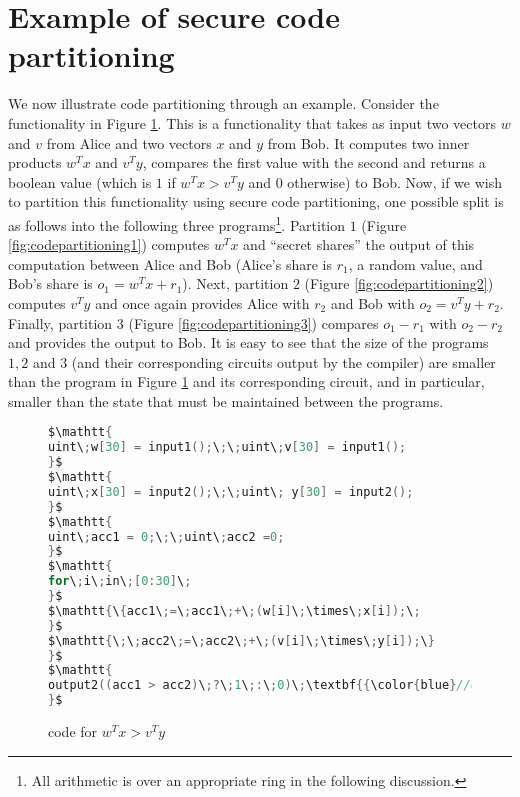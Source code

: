 
\setlength\intextsep{5pt}
\setlength{\textfloatsep}{5pt}
\setlength{\abovecaptionskip}{5pt}
\setlength{\belowcaptionskip}{5pt}

\section{Example of secure code partitioning}\label{app:codepartitioning}
We now illustrate code partitioning through an example. Consider the functionality in Figure \ref{fig:largecode}. This is a functionality that takes as input two vectors $w$ and $v$ from Alice and two vectors $x$ and $y$ from Bob. It computes two inner products $w^Tx$ and $v^Ty$, compares the first value with the second and returns a boolean value (which is $1$ if $w^Tx>v^Ty$ and $0$ otherwise) to Bob. Now, if we wish to partition this functionality using secure code partitioning, one possible split is as follows into the following three programs\footnote{All arithmetic is over an appropriate ring in the following discussion.}. Partition $1$ (Figure \ref{fig:codepartitioning1}) computes $w^Tx$ and ``secret shares'' the output of this computation between Alice and Bob (Alice's share is $r_1$, a random value, and Bob's share is $o_1 = w^Tx+r_1$). Next, partition $2$ (Figure \ref{fig:codepartitioning2}) computes $v^Ty$ and once again provides Alice with $r_2$ and Bob with $o_2 = v^Ty+r_2$. Finally, partition $3$ (Figure \ref{fig:codepartitioning3}) compares $o_1-r_1$ with $o_2-r_2$ and provides the output to Bob. It is easy to see that the size of the programs $1, 2$ and $3$ (and their corresponding circuits output by the \tool compiler) are smaller than the program in Figure \ref{fig:largecode} and its corresponding circuit, and in particular, smaller than the state that must be maintained between the programs.

\begin{figure}
\begin{lstlisting}[language=C,mathescape=true]
$\mathtt{
uint\;w[30] = input1();\;\;uint\;v[30] = input1();
}$
$\mathtt{
uint\;x[30] = input2();\;\;uint\; y[30] = input2();
}$
$\mathtt{
uint\;acc1 = 0;\;\;uint\;acc2 =0;
}$
$\mathtt{
for\;i\;in\;[0:30]\;
}$
$\mathtt{\{acc1\;=\;acc1\;+\;(w[i]\;\times\;x[i]);\;
}$
$\mathtt{\;\;acc2\;=\;acc2\;+\;(v[i]\;\times\;y[i]);\}
}$
$\mathtt{
output2((acc1 > acc2)\;?\;1\;:\;0)\;\textbf{{\color{blue}//only to party 2}}
}$
\end{lstlisting}
\caption{\tool code for $w^Tx > v^Ty$}
\label{fig:largecode}
\end{figure}

